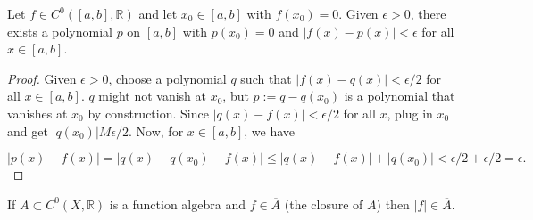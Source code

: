 \begin{lemma}\label{ra.stone.lem.class}

Let \(f \in C^0([a,b], \mathbb{R})\) and let \(x_0 \in [a,b]\) with \(f(x_0) = 0\). Given \(\epsilon > 0\), there exists a polynomial \(p\) on \([a,b]\) with \(p(x_0) = 0\) and \(|f(x) - p(x) | < \epsilon\) for all \(x \in [a,b]\).

\end{lemma}

\begin{proof}

Given \(\epsilon > 0\), choose a polynomial \(	q\) such that \(|f(x) - q(x)| < \epsilon/2\) for all \(x \in [a,b]\). \(q\) might not vanish at \(x_0\), but \(p := q - q(x_0)\) is a polynomial that vanishes at \(x_0\) by construction. Since \(|q(x) - f(x)| < \epsilon/2\) for all \(x\), plug in \(x_0\) and get \(|q(x_0)| M \epsilon/2\). Now, for \(x \in [a,b]\), we have

\[
|p(x) - f(x)| = |q(x) - q(x_0) - f(x)| \leq |q(x) - f(x) | + |q(x_0)| < \epsilon/2 + \epsilon/2 = \epsilon.
\]

\end{proof}

\begin{lemma}\label{ra.stone.strass.step.1.lem}

If \(A \subset C^0(X, \mathbb{R})\) is a function algebra and \(f \in \overline{A}\) (the closure of \(A\)) then \(|f| \in \overline{A}\).

\end{lemma}


